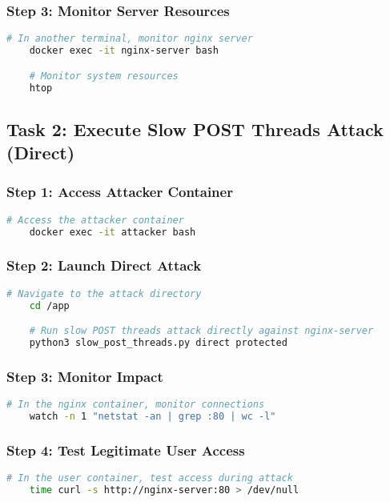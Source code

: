 \documentclass[12pt]{article}
\begin{document}
    \subsubsection{Step 3: Monitor Server Resources}
    \begin{lstlisting}[language=bash]
    # In another terminal, monitor nginx server
    docker exec -it nginx-server bash

    # Monitor system resources
    htop
    \end{lstlisting}

    \subsection{Task 2: Execute Slow POST Threads Attack (Direct)}

    \subsubsection{Step 1: Access Attacker Container}
    \begin{lstlisting}[language=bash]
    # Access the attacker container
    docker exec -it attacker bash
    \end{lstlisting}

    \subsubsection{Step 2: Launch Direct Attack}
    \begin{lstlisting}[language=bash]
    # Navigate to the attack directory
    cd /app

    # Run slow POST threads attack directly against nginx-server
    python3 slow_post_threads.py direct protected
    \end{lstlisting}

    \subsubsection{Step 3: Monitor Impact}
    \begin{lstlisting}[language=bash]
    # In the nginx container, monitor connections
    watch -n 1 "netstat -an | grep :80 | wc -l"
    \end{lstlisting}

    \subsubsection{Step 4: Test Legitimate User Access}
    \begin{lstlisting}[language=bash]
    # In the user container, test access during attack
    time curl -s http://nginx-server:80 > /dev/null
    \end{lstlisting}
\end{document}
